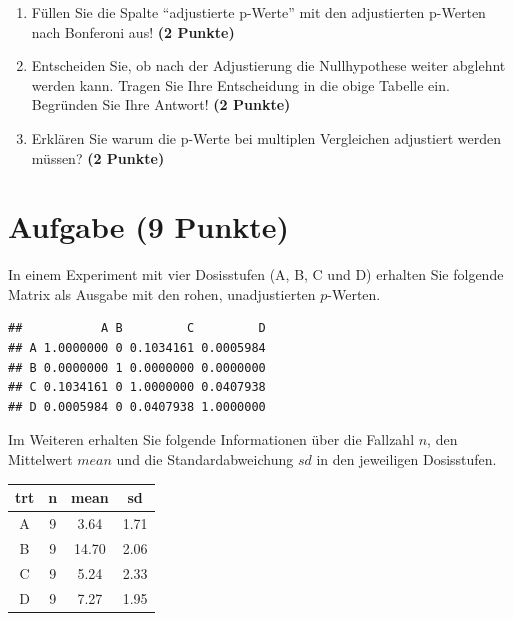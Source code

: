 \documentclass[a4paper, 10pt]{scrartcl}\usepackage[]{graphicx}\usepackage[]{xcolor}
\makeatletter
\newenvironment{kframe}{%
 \def\at@end@of@kframe{}%
 \ifinner\ifhmode%
  \def\at@end@of@kframe{\end{minipage}}%
  \begin{minipage}{\columnwidth}%
 \fi\fi%
 \def\FrameCommand##1{\hskip\@totalleftmargin \hskip-\fboxsep
 \colorbox{shadecolor}{##1}\hskip-\fboxsep
     \hskip-\linewidth \hskip-\@totalleftmargin \hskip\columnwidth}%
 \MakeFramed {\advance\hsize-\width
   \@totalleftmargin\z@ \linewidth\hsize
   \@setminipage}}%
 {\par\unskip\endMakeFramed%
 \at@end@of@kframe}
\newenvironment{knitrout}{}{} %
\makeatother
\begin{document}
\begin{enumerate}
\item F{\"u}llen Sie die Spalte "`adjustierte p-Werte"' mit den adjustierten
  p-Werten nach Bonferoni aus! \textbf{(2 Punkte)}
\item Entscheiden Sie, ob nach der Adjustierung die Nullhypothese weiter
  abglehnt werden kann. Tragen Sie Ihre Entscheidung in die obige Tabelle
  ein. Begr{\"u}nden Sie Ihre Antwort! \textbf{(2 Punkte)}
\item Erkl{\"a}ren Sie warum die p-Werte bei multiplen Vergleichen
  adjustiert werden m{\"u}ssen? \textbf{(2 Punkte)}
\end{enumerate}

\vspace{1Ex}

 
\clearpage

\section{Aufgabe \hfill (9 Punkte)}

In einem Experiment mit vier Dosisstufen (A, B, C und D) erhalten Sie
folgende Matrix als \Rlogo Ausgabe mit den rohen, unadjustierten $p$-Werten. 



\begin{knitrout}
\color{fgcolor}\begin{kframe}
\begin{verbatim}
##           A B         C         D
## A 1.0000000 0 0.1034161 0.0005984
## B 0.0000000 1 0.0000000 0.0000000
## C 0.1034161 0 1.0000000 0.0407938
## D 0.0005984 0 0.0407938 1.0000000
\end{verbatim}
\end{kframe}
\end{knitrout}

Im Weiteren erhalten Sie folgende Informationen {\"u}ber die Fallzahl $n$, den
Mittelwert $mean$ und die Standardabweichung $sd$ in den jeweiligen Dosisstufen.

\begin{knitrout}
\color{fgcolor}\begin{table}[!h]
\centering
\begin{tabular}{cccc}
\toprule
trt & n & mean & sd\\
\midrule
A & 9 & 3.64 & 1.71\\
B & 9 & 14.70 & 2.06\\
C & 9 & 5.24 & 2.33\\
D & 9 & 7.27 & 1.95\\
\bottomrule
\end{tabular}
\end{table}

\end{knitrout}
\end{document}
